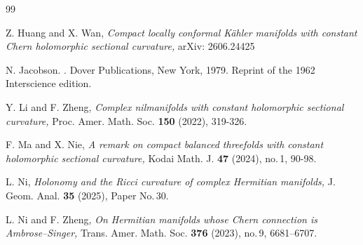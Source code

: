 \documentclass{amsart}
\begin{document}
\begin{thebibliography}{99}







 Z. Huang and X. Wan, \emph{Compact locally conformal K\"ahler manifolds with constant Chern holomorphic sectional curvature,} arXiv: 2606.24425

N. Jacobson.
.
\newblock Dover Publications, New York, 1979.
\newblock Reprint of the 1962 Interscience edition.

 Y. Li and F. Zheng, \emph{Complex nilmanifolds with constant holomorphic sectional curvature,}  Proc. Amer. Math. Soc. {\bf 150} (2022), 319-326.

 F. Ma and X. Nie, \emph{A remark on compact balanced threefolds with constant holomorphic sectional curvature,} Kodai Math. J. {\bf 47} (2024), no.\,1, 90-98.

 {L. Ni, \emph{Holonomy and the Ricci curvature of complex
Hermitian manifolds,} J. Geom. Anal. {\bf 35} (2025), Paper No.\,30.}

 {L. Ni and F. Zheng, \emph{On Hermitian manifolds whose
Chern connection is Ambrose--Singer,} Trans. Amer. Math. Soc. {\bf 376}
(2023), no.\,9, 6681--6707.}



\end{thebibliography}
\end{document}
